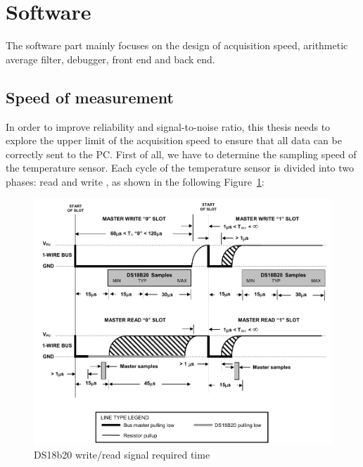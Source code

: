 \section{Software}
\label{sec:Software}
The software part mainly focuses on the design of acquisition speed, arithmetic average filter, debugger, front end and back end.

\subsection{Speed of measurement}
\label{sec:Speed of measurement}
In order to improve reliability and signal-to-noise ratio, this thesis needs to explore the upper limit of the acquisition speed to ensure that all data can be correctly sent to the PC.
First of all, we have to determine the sampling speed of the temperature sensor. Each cycle of the temperature sensor is divided into two phases: read and write  \cite{shen2006embedded}, as shown in the following Figure~\ref{fig:5.5}:
\begin{figure}[!ht]
	\centering
	\includegraphics[width=16cm]{grafiken/5.5.pdf}
	\caption{DS18b20 write/read signal required time} 
	\label{fig:5.5}
\end{figure}
\FloatBarrier

